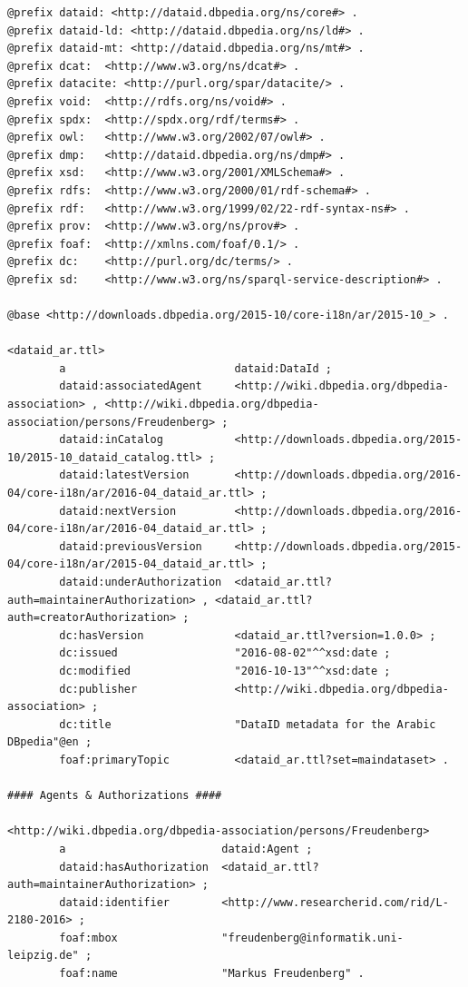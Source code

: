 \documentclass[a4paper,english,twoside,BCOR1.5cm,headsepline,DIV12,appendixprefix,final,12pt]{scrbook}
\begin{document}
\label{chap:appendix1}
\begin{lstlisting}[language=ttl, captionpos=b, label=lst:dcex,linewidth=\columnwidth,breaklines=true,basicstyle=\ttfamily\scriptsize]
@prefix dataid: <http://dataid.dbpedia.org/ns/core#> .
@prefix dataid-ld: <http://dataid.dbpedia.org/ns/ld#> .
@prefix dataid-mt: <http://dataid.dbpedia.org/ns/mt#> .
@prefix dcat:  <http://www.w3.org/ns/dcat#> .
@prefix datacite: <http://purl.org/spar/datacite/> .
@prefix void:  <http://rdfs.org/ns/void#> .
@prefix spdx:  <http://spdx.org/rdf/terms#> .
@prefix owl:   <http://www.w3.org/2002/07/owl#> .
@prefix dmp:   <http://dataid.dbpedia.org/ns/dmp#> .
@prefix xsd:   <http://www.w3.org/2001/XMLSchema#> .
@prefix rdfs:  <http://www.w3.org/2000/01/rdf-schema#> .
@prefix rdf:   <http://www.w3.org/1999/02/22-rdf-syntax-ns#> .
@prefix prov:  <http://www.w3.org/ns/prov#> .
@prefix foaf:  <http://xmlns.com/foaf/0.1/> .
@prefix dc:    <http://purl.org/dc/terms/> .
@prefix sd:    <http://www.w3.org/ns/sparql-service-description#> .

@base <http://downloads.dbpedia.org/2015-10/core-i18n/ar/2015-10_> .

<dataid_ar.ttl>
        a                          dataid:DataId ;
        dataid:associatedAgent     <http://wiki.dbpedia.org/dbpedia-association> , <http://wiki.dbpedia.org/dbpedia-association/persons/Freudenberg> ;
        dataid:inCatalog           <http://downloads.dbpedia.org/2015-10/2015-10_dataid_catalog.ttl> ;
        dataid:latestVersion       <http://downloads.dbpedia.org/2016-04/core-i18n/ar/2016-04_dataid_ar.ttl> ;
        dataid:nextVersion         <http://downloads.dbpedia.org/2016-04/core-i18n/ar/2016-04_dataid_ar.ttl> ;
    	dataid:previousVersion     <http://downloads.dbpedia.org/2015-04/core-i18n/ar/2015-04_dataid_ar.ttl> ;
        dataid:underAuthorization  <dataid_ar.ttl?auth=maintainerAuthorization> , <dataid_ar.ttl?auth=creatorAuthorization> ;
        dc:hasVersion              <dataid_ar.ttl?version=1.0.0> ;
        dc:issued                  "2016-08-02"^^xsd:date ;
        dc:modified                "2016-10-13"^^xsd:date ;
        dc:publisher               <http://wiki.dbpedia.org/dbpedia-association> ;
        dc:title                   "DataID metadata for the Arabic DBpedia"@en ;
        foaf:primaryTopic          <dataid_ar.ttl?set=maindataset> .

#### Agents & Authorizations ####

<http://wiki.dbpedia.org/dbpedia-association/persons/Freudenberg>
        a                        dataid:Agent ;
        dataid:hasAuthorization  <dataid_ar.ttl?auth=maintainerAuthorization> ;
        dataid:identifier        <http://www.researcherid.com/rid/L-2180-2016> ;
        foaf:mbox                "freudenberg@informatik.uni-leipzig.de" ;
        foaf:name                "Markus Freudenberg" .
        

\end{lstlisting}
\end{document}
